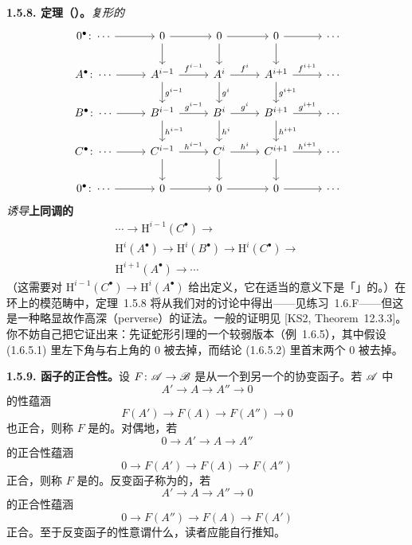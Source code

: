 \textbf{1.5.8. 定理（\trLongExactSequence）。}\quad \emph{复形的\trShortExactSequence}
\[
\begin{tikzcd}[row sep=1.9em, column sep=2.6em]
0^{\bullet}\colon\cdots \ar[r] & 0 \ar[r] \ar[d] & 0 \ar[r] \ar[d] & 0 \ar[r] \ar[d] & \cdots \\
A^{\bullet}\colon\cdots \ar[r] & A^{i-1} \ar[r,"f^{i-1}"] \ar[d,"g^{i-1}"] & A^{i} \ar[r,"f^{i}"] \ar[d,"g^{i}"] & A^{i+1} \ar[r,"f^{i+1}"] \ar[d,"g^{i+1}"] & \cdots \\
B^{\bullet}\colon\cdots \ar[r] & B^{i-1} \ar[r,"g^{i-1}"] \ar[d,"h^{i-1}"] & B^{i} \ar[r,"g^{i}"] \ar[d,"h^{i}"] & B^{i+1} \ar[r,"g^{i+1}"] \ar[d,"h^{i+1}"] & \cdots \\
C^{\bullet}\colon\cdots \ar[r] & C^{i-1} \ar[r,"h^{i-1}"] \ar[d] & C^{i} \ar[r,"h^{i}"] \ar[d] & C^{i+1} \ar[r,"h^{i+1}"] \ar[d] & \cdots \\
0^{\bullet}\colon\cdots \ar[r] & 0 \ar[r] & 0 \ar[r] & 0 \ar[r] & \cdots
\end{tikzcd}
\]
\emph{诱导}\textbf{上同调的\trLongExactSequence}
\[
\begin{gathered}
\cdots\longrightarrow\mathrm{H}^{i-1}(C^{\bullet})\longrightarrow\\
\mathrm{H}^{i}(A^{\bullet})\longrightarrow\mathrm{H}^{i}(B^{\bullet})\longrightarrow\mathrm{H}^{i}(C^{\bullet})\longrightarrow\\
\mathrm{H}^{i+1}(A^{\bullet})\longrightarrow\cdots
\end{gathered}
\]
（这需要对\textbf{\trConnectingHomomorphism}{} $\mathrm{H}^{i-1}(C^{\bullet})\to\mathrm{H}^{i}(A^{\bullet})$ 给出定义，它在适当的意义下是「\trNatural」的。）在环上的模范畴中，定理~1.5.8 将从我们对\trSpectralSequence{}的讨论中得出——见练习~1.6.F——但这是一种略显故作高深（perverse）的证法。一般的证明见 [KS2, Theorem~12.3.3]。你不妨自己把它证出来：先证蛇形引理的一个较弱版本（例~1.6.5），其中假设 (1.6.5.1) 里左下角与右上角的 $0$ 被去掉，而结论 (1.6.5.2) 里首末两个 $0$ 被去掉。

\textbf{1.5.9. 函子的正合性。}\quad 设 $F\colon\mathscr{A}\to\mathscr{B}$ 是从一个\trAbelianCategory{}到另一个\trAbelianCategory{}的\trAdditive{}协变函子。若 $\mathscr{A}$ 中
\[
A'\longrightarrow A\longrightarrow A''\longrightarrow 0
\]
的\trExactSequence{}性蕴涵
\[
F(A')\longrightarrow F(A)\longrightarrow F(A'')\longrightarrow 0
\]
也正合，则称 $F$ 是\trRightExact{}的。对偶地，若
\[
0\longrightarrow A'\longrightarrow A\longrightarrow A''
\]
的正合性蕴涵
\[
0\longrightarrow F(A')\longrightarrow F(A)\longrightarrow F(A'')
\]
正合，则称 $F$ 是\trLeftExact{}的。\trAdditive{}反变函子称为\trLeftExact{}的，若
\[
A'\longrightarrow A\longrightarrow A''\longrightarrow 0
\]
的正合性蕴涵
\[
0\longrightarrow F(A'')\longrightarrow F(A)\longrightarrow F(A')
\]
正合。至于反变函子的\trRightExact{}性意谓什么，读者应能自行推知。

